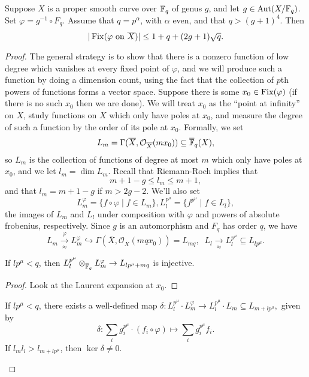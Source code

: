 \begin{thm} Suppose $X$ is a proper smooth curve over $\mathbb{F}_q$ of genus $g$, and let $g \in \operatorname{Aut}(X/\mathbb{F}_q)$. Set $\varphi = g^{-1}\circ F_q$. Assume that $q = p^\alpha$, with $\alpha$ even, and that $q > (g+1)^4$. Then
\[
|\operatorname{Fix}(\varphi \text{\rm{ on }}\overline{X})| \le 1 + q + (2g+1)\sqrt{q}.
\]
\end{thm}
\begin{proof} The general strategy is to show that there is a nonzero function of low degree which vanishes at every fixed point of $\varphi$, and we will produce such a function by doing a dimension count, using the fact that the collection of $p$th powers of functions forms a vector space. Suppose there is some $x_0 \in \operatorname{Fix}(\varphi)$ (if there is no such $x_0$ then we are done). We will treat $x_0$ as the ``point at infinity'' on $X$, study functions on $X$ which only have poles at $x_0$, and measure the degree of such a function by the order of its pole at $x_0$. Formally, we set
\[
L_m = \Gamma(\overline{X},\mathcal{O}_{\overline{X}}(mx_0)) \subseteq \overline{\mathbb{F}}_q(X),
\]
so $L_m$ is the collection of functions of degree at most $m$ which only have poles at $x_0$, and we let $l_m = \dim L_m$. Recall that Riemann-Roch implies that
\[
m+1-g \le l_m \le m+1,
\]
and that $l_m = m+1-g$ if $m > 2g-2$. We'll also set
\[
L_m^{\varphi} = \{f\circ \varphi \mid f \in L_m\}, L_l^{p^{\mu}} = \{f^{p^{\mu}} \mid f \in L_l\},
\]
the images of $L_m$ and $L_l$ under composition with $\varphi$ and powers of absolute frobenius, respectively. Since $g$ is an automorphism and $F_q$ has order $q$, we have
\[
L_m \xrightarrow[\approx]{\varphi} L_m^{\varphi} \hookrightarrow \Gamma(\overline{X},\mathcal{O}_{\overline{X}}(mqx_0)) = L_{mq},\;\; L_l \xrightarrow[\approx]{} L_l^{p^{\mu}} \subseteq L_{lp^{\mu}}.
\]

\begin{lem} If $lp^{\mu} < q$, then $L_l^{p^{\mu}}\otimes_{\overline{\mathbb{F}}_q} L_m^{\varphi} \rightarrow L_{lp^{\mu}+mq}$ is injective.
\end{lem}
\begin{proof} Look at the Laurent expansion at $x_0$.
\end{proof}

\begin{cor} If $lp^{\mu} < q$, there exists a well-defined map $\delta: L_l^{p^{\mu}}\cdot L_m^{\varphi} \rightarrow L_l^{p^{\mu}}\cdot L_m \subseteq L_{m+lp^{\mu}},$ given by
\[
\delta : \sum_i g_i^{p^{\mu}}\cdot (f_i\circ \varphi) \mapsto \sum_i g_i^{p^{\mu}}f_i.
\]
If $l_ml_l > l_{m+lp^{\mu}}$, then $\ker \delta \ne 0$.
\end{cor}


\end{proof}
